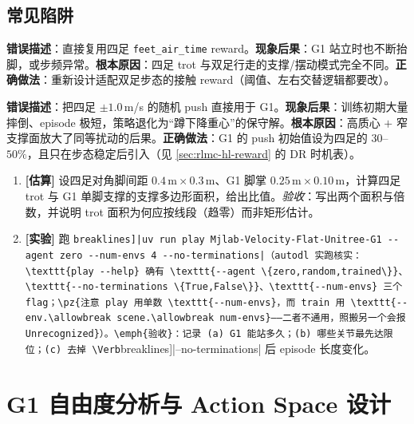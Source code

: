 \subsection{常见陷阱}
\begin{pitfall}
\textbf{错误描述}：直接复用四足 \texttt{feet\_air\_time} reward。\textbf{现象后果}：G1 站立时也不断抬脚，或步频异常。\textbf{根本原因}：四足 trot 与双足行走的支撑/摆动模式完全不同。\textbf{正确做法}：重新设计适配双足步态的接触 reward（阈值、左右交替逻辑都要改）。
\end{pitfall}

\begin{pitfall}
\textbf{错误描述}：把四足 $\pm 1.0$\,m/s 的随机 push 直接用于 G1。\textbf{现象后果}：训练初期大量摔倒、episode 极短，策略退化为“蹲下降重心”的保守解。\textbf{根本原因}：高质心 $+$ 窄支撑面放大了同等扰动的后果。\textbf{正确做法}：G1 的 push 初始值设为四足的 $30$--$50\%$，且只在步态稳定后引入（见 \cref{sec:rlmc-hl-reward} 的 DR 时机表）。
\end{pitfall}

\begin{practice}[本节动手]
\begin{enumerate}
  \item \textbf{[估算]} 设四足对角脚间距 $0.4\,\mathrm{m}\times0.3\,\mathrm{m}$、G1 脚掌 $0.25\,\mathrm{m}\times0.10\,\mathrm{m}$，计算四足 trot 与 G1 单脚支撑的支撑多边形面积，给出比值。\emph{验收}：写出两个面积与倍数，并说明 trot 面积为何应按线段（趋零）而非矩形估计。
  \item \textbf{[实验]} 跑 \Verb[breaklines]|uv run play Mjlab-Velocity-Flat-Unitree-G1 --agent zero --num-envs 4 --no-terminations|（autodl 实跑核实：\texttt{play --help} 确有 \texttt{--agent \{zero,random,trained\}}、\texttt{--no-terminations \{True,False\}}、\texttt{--num-envs} 三个 flag；\pz{注意 play 用单数 \texttt{--num-envs}，而 train 用 \texttt{--env.\allowbreak scene.\allowbreak num-envs}——二者不通用，照搬另一个会报 Unrecognized}）。\emph{验收}：记录 (a) G1 能站多久；(b) 哪些关节最先达限位；(c) 去掉 \Verb[breaklines]|--no-terminations| 后 episode 长度变化。
\end{enumerate}
\end{practice}

\section{G1 自由度分析与 Action Space 设计}\label{sec:rlmc-hl-action}

